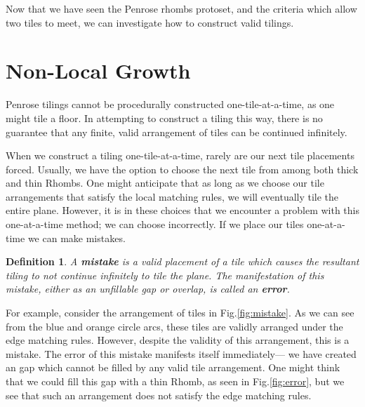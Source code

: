 \documentclass[
  oneside,
  11pt, a4paper,
  footinclude=true,
  headinclude=true,
  cleardoublepage=empty
]{scrbook}
\newtheorem{mydef}{Definition}
\begin{document}
Now that we have seen the Penrose rhombs protoset, and the criteria which allow two tiles to meet, we can investigate how to construct valid tilings. 


\section{Non-Local Growth} %
Penrose tilings cannot be procedurally constructed one-tile-at-a-time, as one might tile a floor. In attempting to construct a tiling this way, there is no guarantee that any finite, valid arrangement of tiles can be continued infinitely. 

When we construct a tiling one-tile-at-a-time, rarely are our next tile placements forced. Usually, we have the option to choose the next tile from among both thick and thin Rhombs. One might anticipate that as long as we choose our tile arrangements that satisfy the local matching rules, we will eventually tile the entire plane. However, it is in these choices that we encounter a problem with this one-at-a-time method; we can choose incorrectly. If we place our tiles one-at-a-time we can make mistakes.

\begin{mydef}
A \textbf{mistake} is a valid placement of a tile which causes the resultant tiling to not continue infinitely to tile the plane. The manifestation of this mistake, either as an unfillable gap or overlap, is called an \textbf{error}. \cite{Penrose1989,Ross}
\end{mydef}

For example, consider the arrangement of tiles in Fig.\ref{fig:mistake}. As we can see from the blue and orange circle arcs, these tiles are validly arranged under the edge matching rules. However, despite the validity of this arrangement, this is a mistake. The error of this mistake manifests itself immediately--- we have created an gap which cannot be filled by any valid tile arrangement. One might think that we could fill this gap with a thin Rhomb, as seen in Fig.\ref{fig:error}, but we see that such an arrangement does not satisfy the edge matching rules.
\end{document}
